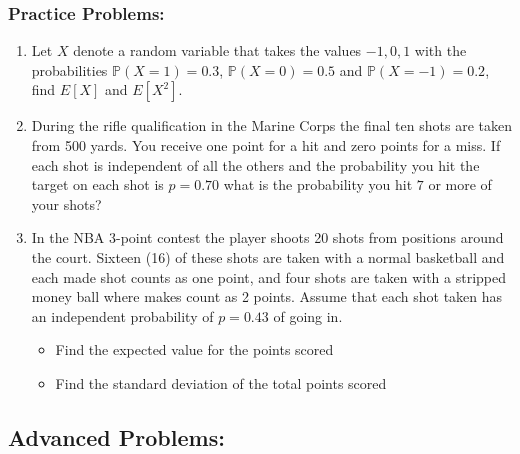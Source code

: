 \documentclass[
]{book}
\providecommand{\tightlist}{%
  \setlength{\itemsep}{0pt}\setlength{\parskip}{0pt}}
\newcommand{\prob}[1]{{\mathbb{P}(#1)}}
\theoremstyle{definition}
\theoremstyle{definition}
\theoremstyle{definition}
\theoremstyle{definition}
\theoremstyle{remark}
\begin{document}
\hypertarget{practice-problems-5}{%
\subsubsection{Practice Problems:}\label{practice-problems-5}}

\begin{enumerate}
\def\labelenumi{\arabic{enumi}.}
\item
  Let \(X\) denote a random variable that takes the values \(-1,0,1\) with the probabilities \(\prob{X=1}=0.3\), \(\prob{X=0}=0.5\) and \(\prob{X=-1}=0.2\), find \(E[X]\) and \(E[X^2]\).
\item
  During the rifle qualification in the Marine Corps the final ten shots are taken from 500 yards. You receive one point for a hit and zero points for a miss. If each shot is independent of all the others and the probability you hit the target on each shot is \(p=0.70\) what is the probability you hit \(7\) or more of your shots?
\item
  In the NBA 3-point contest the player shoots 20 shots from positions around the court. Sixteen (16) of these shots are taken with a normal basketball and each made shot counts as one point, and four shots are taken with a stripped money ball where makes count as 2 points. Assume that each shot taken has an independent probability of \(p=0.43\) of going in.

  \begin{itemize}
  \tightlist
  \item
    Find the expected value for the points scored
  \item
    Find the standard deviation of the total points scored
  \end{itemize}
\end{enumerate}

\hypertarget{advanced-problems-5}{%
\subsection{Advanced Problems:}\label{advanced-problems-5}}
\end{document}
